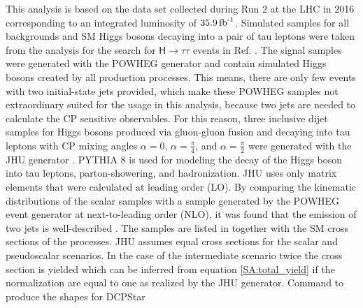 This analysis is based on the data set collected during Run 2 at the LHC in 2016 corresponding to an integrated luminosity of $\text{35.9\,fb}^\text{-1}$.
Simulated samples for all backgrounds and SM Higgs bosons decaying into a pair of tau leptons were taken from the analysis for the search for $\mathsf{H\rightarrow\tau\tau}$ events in Ref. \cite{Sirunyan:2017khh}.
The signal samples were generated with the POWHEG generator and contain simulated Higgs bosons created by all production processes. This means, there are only few events with two initial-state jets provided, which make 
these POWHEG samples not extraordinary suited for the usage in this analysis, because two jets are needed to calculate the CP sensitive observables.
For this reason, three inclusive dijet samples for Higgs bosons produced via gluon-gluon fusion and decaying into tau leptons
with CP mixing angles $\alpha=0$, $\alpha=\frac{\pi}{4}$, and $\alpha=\frac{\pi}{2}$ were generated with the JHU generator \cite{constrainingHiggsAtProtonColliders,spin_determination,onthespin,constrainHiggsBosonCoupingsWithMET}.
PYTHIA 8 \cite{pythia} is used for modeling the decay of the Higgs boson into tau leptons, parton-showering, and hadronization. JHU uses only
matrix elements that were calculated at leading order (LO). By comparing the kinematic distributions of the scalar samples with a sample generated by the 
POWHEG event generator at next-to-leading order (NLO), it was found that the emission of two jets is well-described \cite{CMS-AN-17-034}.
The samples are listed in  together with the SM cross sections of the processes.
JHU assumes equal cross sections for the scalar and pseudoscalar scenarios. In the case of the intermediate scenario twice the cross section is yielded which can be inferred from equation \eqref{SA:total_yield} if the normalization are equal to one
as realized by the JHU generator. 
Command to produce the shapes for DCPStar 
